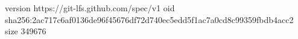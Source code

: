 version https://git-lfs.github.com/spec/v1
oid sha256:2ac717c6af0136de96f45676df72d740ec5edd5f1ac7a0cd8c99359fbdb4acc2
size 349676
